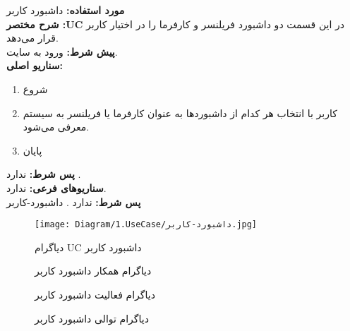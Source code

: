 \textbf{مورد استفاده:}
داشبورد کاربر
\\
\textbf{شرح مختصر :UC}
در این قسمت دو داشبورد فریلنسر و کارفرما را در اختیار کاربر قرار می‌دهد.
\\
\textbf{پيش شرط:}
ورود به سایت.
\\
\textbf{سناريو اصلی:}
\begin{enumerate}
\item
شروع
\item
کاربر با انتخاب هر کدام از داشبوردها به عنوان کارفرما یا فریلنسر به سیستم معرفی می‌شود.
\item
پایان
\end{enumerate}

\noindent
\textbf{پس شرط:}
ندارد .
\\
\textbf{سناريوهای فرعی:}
ندارد.
\\
\textbf{پس شرط:}
ندارد .
داشبورد-کاربر

\begin{figure}[H]
	\centering
	\texttt{[image: Diagram/1.UseCase/داشبورد-کاربر.jpg]}
	\caption{دیاگرام UC داشبورد کاربر‌}
	\label{fig:uc:داشبورد-کاربر}
\end{figure}
\begin{figure}[H]
\centering
\caption{دیاگرام همکار داشبورد کاربر}
\label{fig:c:داشبورد-کاربر}
\end{figure}
\begin{figure}[H]
	\centering
	\caption{دیاگرام فعالیت ‌داشبورد کاربر}
	\label{fig:a:داشبورد-کاربر}
\end{figure}
\begin{figure}[H]
	\caption{دیاگرام توالی ‌داشبورد کاربر}
	\centering
	\label{fig:s:داشبورد-کاربر}
\end{figure}
